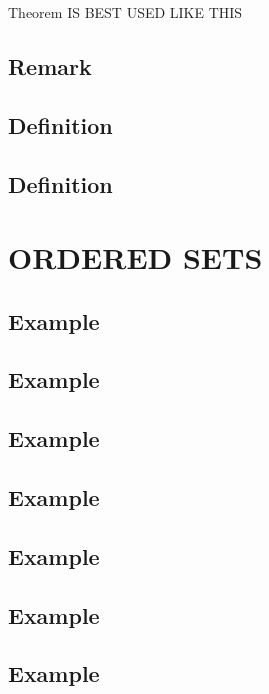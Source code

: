 \begin{theorem}
Theorem IS BEST USED LIKE THIS
\end{theorem}

\subsection*{\textbf{Remark}}
\label{sec:2}

\subsection*{\textbf{Definition}}
\label{sec:3}

\subsection*{\textbf{Definition}}
\label{sec:4}

\section{ORDERED SETS}







\subsection*{\textbf{Example}}
\label{sec:5}
\subsection*{\textbf{Example}}
\label{sec:6}
\subsection*{\textbf{Example}}
\label{sec:7}
\subsection*{\textbf{Example}}
\label{sec:8}
\subsection*{\textbf{Example}}
\label{sec:9}
\subsection*{\textbf{Example}}
\label{sec:10}
\subsection*{\textbf{Example}}
\label{sec:11}


